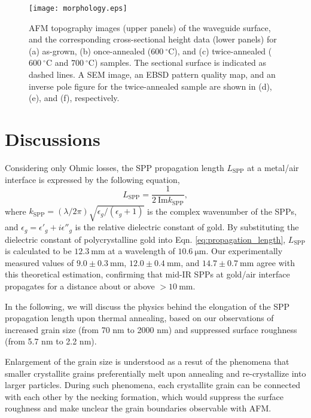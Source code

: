 \documentclass[aip,apl,reprint]{revtex4-1}
\begin{document}
  \begin{figure}
    \texttt{[image: morphology.eps]}
        \caption{AFM topography images (upper panels) of the waveguide surface, and the corresponding cross-sectional height data (lower panels) for (a) as-grown, (b) once-annealed ($600\:^\circ\mathrm{C}$), and (c) twice-annealed ($600\:^\circ\mathrm{C}$ and $700\:^\circ\mathrm{C}$) samples. The sectional surface is indicated as dashed lines. \color{red}A SEM image, an EBSD pattern quality map, and an inverse pole figure for the twice-annealed sample are shown in (d), (e), and (f), respectively.\color{black}}
    \label{fig:morphology}
\end{figure}

\section{Discussions}
\label{sec:discussion}
Considering only Ohmic losses, the SPP propagation length $L_{\mathrm{SPP}}$ at a metal/air interface is expressed by the following equation,
\begin{equation}
 L_{\mathrm{SPP}} = \frac{1}{2\:\mathrm{Im} k_{\mathrm{SPP}}},
\label{eq:propagation_length}
 \end{equation}
where $k_{\mathrm{SPP}}=(\lambda/2\pi)\sqrt{\epsilon_g/(\epsilon_g+1)}$ is the complex wavenumber of the SPPs, and $\epsilon_g=\epsilon'_g+i\epsilon''_g$ is the relative dielectric constant of gold. 
By substituting the dielectric constant of polycrystalline gold\cite{Palik} into Eqn. \ref{eq:propagation_length}, \color{red}$L_{\mathrm{SPP}}$ \color{black}is calculated to be $12.3\:\mathrm{mm}$ at a wavelength of $10.6\:\mathrm{\mu m}$.
Our experimentally measured values of  $9.0\pm0.3\:\mathrm{mm}$, $12.0\pm0.4\:\mathrm{mm}$, and $14.7\pm0.7\:\mathrm{mm}$ agree with this theoretical estimation, confirming that mid-IR SPPs at gold/air interface propagates for a distance about or above $>10\:\mathrm{mm}$.

In the following, we will discuss the physics behind the elongation of the SPP propagation length upon thermal annealing, based on our observations of increased grain size (from 70 nm to 2000 nm) and suppressed surface roughness (from 5.7 nm to 2.2 nm). 

Enlargement of the grain size is understood as a resut of the phenomena that smaller crystallite grains preferentially melt upon annealing\cite{Buffat} and re-crystallize into larger particles. 
\color{red} During such phenomena, each crystallite grain can be connected with each other by the necking formation, which would suppress the surface roughness and make unclear the grain boundaries observable with AFM.
\end{document}
